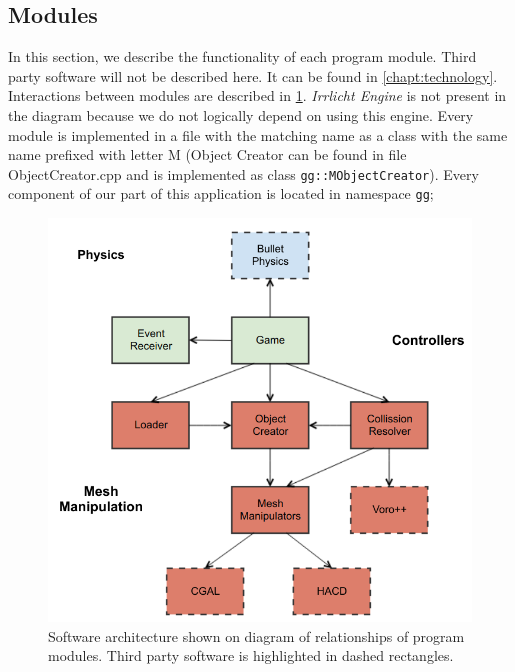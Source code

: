 \subsection{Modules}
In this section, we describe the functionality of each program module. Third party software will not be described here. It can be found in \cref{chapt:technology}. Interactions between modules are described in \cref{fig:modules}. \emph{Irrlicht Engine} is not present in the diagram because we do not logically depend on using this engine. Every module is implemented in a file with the matching name as a class with the same name prefixed with letter M (Object Creator can be found in file ObjectCreator.cpp and is implemented as class {\tt gg::MObjectCreator}). Every component of our part of this application is located in namespace {\tt gg};

\begin{figure}
        \centering
        \includegraphics[width=\textwidth]{img/objectmodel}
        \caption{Software architecture shown on diagram of relationships of program modules. Third party software is highlighted in dashed rectangles.}
        \label{fig:modules}
\end{figure}

